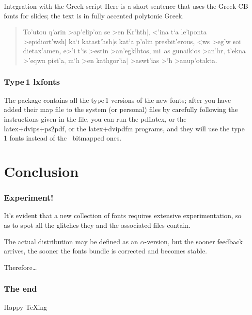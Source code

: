 \documentclass{beamer}\errorcontextlines=9
\begin{document}
\begin{frame}{Integration with the Greek script}
Here is a short sentence that uses the Greek CB fonts for slides; the text is in fully accented polytonic Greek.

\begin{quote}
\begin{otherlanguage}{greek}
To'utou q'arin >ap'elip'on se >en Kr'hth|, <'ina t`a le'iponta
>epidiort'wsh| ka`i katast'hsh|s kat`a p'olin presbit'erous, <ws
>eg'w soi dietax'amen, e>'i t'is >estin >an'egklhtos, mi~as
gunaik`os >an'hr, t'ekna >'eqwn pist'a, m`h >en kathgor'ia|
>aswt'ias >`h >anup'otakta.\end{otherlanguage}\end{quote}
\end{frame}

\begin{frame}\frametitle{Type\,1 lxfonts}
The package contains all the type\,1 versions of the new fonts; after you have added their map file to the system (or personal) files by carefully following the instructions given in the  file, you can run the \alert{pdflatex}, or the \alert{latex+dvips+ps2pdf}, or the \alert{latex+dvipdfm} programs, and they will use the \alert{type\,1} fonts instead of the \MF\ bitmapped ones.
\end{frame}






\section{Conclusion}

\begin{frame}\frametitle{Experiment!}
It's evident that a new collection of fonts requires extensive experimentation, so as to spot all the glitches they and the associated files contain.

\medskip

The actual distribution may be defined as an $\alpha$-version, but the sooner feedback arrives, the sooner the fonts bundle is corrected and becomes stable.

\medskip

Therefore\dots
\end{frame}

\begin{frame}\frametitle{The end}
\begin{center}
\fontsize{37}{35}\selectfont Happy TeXing\\ 

\end{center}
\end{frame}
\end{document}
